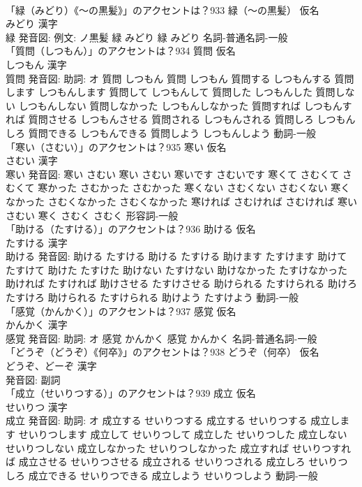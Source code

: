 \documentclass[8pt]{extreport}
\begin{document}
\begin{CJK}{UTF8}{min}
\\	「緑（みどり）《〜の黒髪》」のアクセントは？933	緑（〜の黒髪） 仮名　
\\	みどり 漢字　
\\	緑 発音図: 例文: ノ黒髪	緑 みどり		緑 みどり				名詞-普通名詞-一般 
\\	「質問（しつもん）」のアクセントは？934	質問 仮名　
\\	しつもん 漢字　
\\	質問 発音図: 助詞: オ	質問 しつもん		質問 しつもん 質問する しつもんする 質問します しつもんします 質問して しつもんして 質問した しつもんした 質問しない しつもんしない 質問しなかった しつもんしなかった 質問すれば しつもんすれば 質問させる しつもんさせる 質問される しつもんされる 質問しろ しつもんしろ 質問できる しつもんできる 質問しよう しつもんしよう				動詞-一般 
\\	「寒い（さむい）」のアクセントは？935	寒い 仮名　
\\	さむい 漢字　
\\	寒い 発音図:	寒い さむい		寒い さむい 寒いです さむいです 寒くて さむくて さむくて 寒かった さむかった さむかった 寒くない さむくない さむくない 寒くなかった さむくなかった さむくなかった 寒ければ さむければ さむければ 寒い さむい 寒く さむく さむく				形容詞-一般 
\\	「助ける（たすける）」のアクセントは？936	助ける 仮名　
\\	たすける 漢字　
\\	助ける 発音図:	助ける たすける		助ける たすける 助けます たすけます 助けて たすけて 助けた たすけた 助けない たすけない 助けなかった たすけなかった 助ければ たすければ 助けさせる たすけさせる 助けられる たすけられる 助けろ たすけろ 助けられる たすけられる 助けよう たすけよう				動詞-一般 
\\	「感覚（かんかく）」のアクセントは？937	感覚 仮名　
\\	かんかく 漢字　
\\	感覚 発音図: 助詞: オ	感覚 かんかく		感覚 かんかく				名詞-普通名詞-一般 
\\	「どうぞ（どうぞ）《何卒》」のアクセントは？938	どうぞ（何卒） 仮名　
\\	どうぞ、どーぞ 漢字　
\\	発音図:							副詞 
\\	「成立（せいりつする）」のアクセントは？939	成立 仮名　
\\	せいりつ 漢字　
\\	成立 発音図: 助詞: オ	成立する せいりつする		成立する せいりつする 成立します せいりつします 成立して せいりつして 成立した せいりつした 成立しない せいりつしない 成立しなかった せいりつしなかった 成立すれば せいりつすれば 成立させる せいりつさせる 成立される せいりつされる 成立しろ せいりつしろ 成立できる せいりつできる 成立しよう せいりつしよう				動詞-一般 

\end{CJK}
\end{document}
